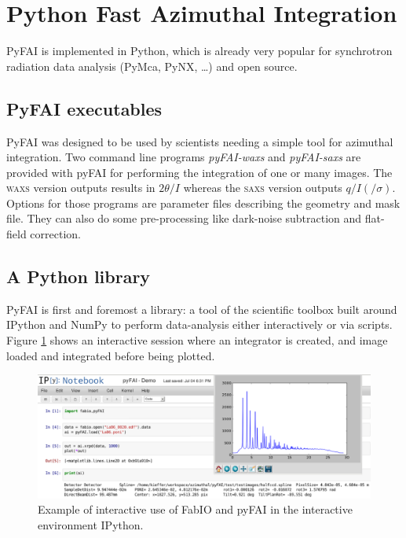 \documentclass[a4paper]{jpconf}
\begin{document}
\section{Python Fast Azimuthal Integration}
PyFAI is implemented in Python, which is already very popular for synchrotron
radiation data analysis (PyMca\cite{pymca}, PyNX\cite{pynx}, \ldots) and open
source.

\subsection{PyFAI executables}
PyFAI was designed to be used by scientists needing a simple tool for azimuthal
integration. Two command line programs \textit{pyFAI-waxs} and
\textit{pyFAI-saxs} are provided with pyFAI for performing the
integration of one or many images. The \textsc{waxs} version outputs results in
$2\theta /I$  whereas the \textsc{saxs} version outputs $q/I(/\sigma )$.
Options for those programs are parameter files describing the geometry and mask file. They can
also do some  pre-processing like dark-noise subtraction and flat-field correction.

\subsection{A Python library}
PyFAI is first and foremost a library: a tool of the scientific
toolbox built around IPython\cite{ipython} and NumPy\cite{numpy} to
perform data-analysis either interactively or via scripts.
Figure \ref{notebook} shows an interactive session where an integrator is
created, and image loaded and integrated before being plotted.

\begin{figure}[h]
\begin{center}
\includegraphics[width=15cm]{img/notebook-l.eps}
\caption{\label{notebook} Example of interactive use of FabIO and pyFAI in the
interactive environment IPython.}
\end{center}
\end{figure}
\end{document}
